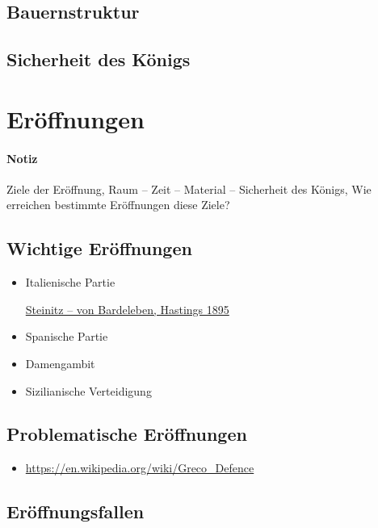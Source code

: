 \documentclass[
  a4paper,
  justified,
  nobib,
]{tufte-handout}
\newenvironment{notiz}{
  \color{Maroon}
  \paragraph*{Notiz}
}{
  \color{black}
}
\begin{document}
\subsection{Bauernstruktur}%
\label{sub:bauernstruktur}

\subsection{Sicherheit des Königs}%
\label{sub:sicherheit_des_konigs}

\section{Eröffnungen}%
\label{sec:eroffnungen}

\begin{notiz}
  Ziele der Eröffnung, Raum – Zeit – Material – Sicherheit des Königs, Wie erreichen
  bestimmte Eröffnungen diese Ziele?
\end{notiz}

\subsection{Wichtige Eröffnungen}%
\label{sub:wichtige_eroffnungen}

\begin{itemize}
  \item Italienische Partie

    \href{https://de.wikipedia.org/wiki/Steinitz_–_von_Bardeleben,_Hastings_1895}{Steinitz
    – von Bardeleben, Hastings 1895}
  \item Spanische Partie
  \item Damengambit
  \item Sizilianische Verteidigung
\end{itemize}

\subsection{Problematische Eröffnungen}%
\label{sub:problematische_eroffnungen}

\begin{itemize}
  \item \url{https://en.wikipedia.org/wiki/Greco_Defence}
\end{itemize}

\subsection{Eröffnungsfallen}%
\label{sub:eroffnungsfallen}
\end{document}
